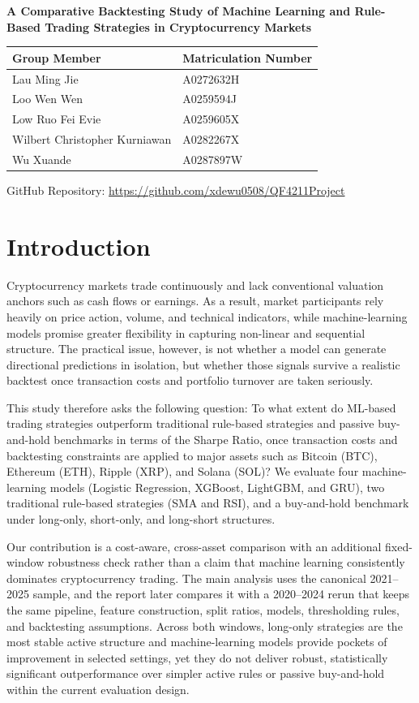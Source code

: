 \documentclass[12pt]{article}
\begin{document}
\begin{center}
{\large \textbf{A Comparative Backtesting Study of Machine Learning and Rule-Based Trading Strategies in Cryptocurrency Markets}}\\[1.5em]

\begingroup
\singlespacing
\begin{tabular}{ll}
\textbf{Group Member} & \textbf{Matriculation Number} \\
\midrule
Lau Ming Jie & A0272632H \\
Loo Wen Wen & A0259594J \\
Low Ruo Fei Evie & A0259605X \\
Wilbert Christopher Kurniawan & A0282267X \\
Wu Xuande & A0287897W \\
\end{tabular}
\endgroup

\vspace{1em}
GitHub Repository: \url{https://github.com/xdewu0508/QF4211Project}
\end{center}

\section{Introduction}

Cryptocurrency markets trade continuously and lack conventional valuation anchors such as cash flows or earnings. As a result, market participants rely heavily on price action, volume, and technical indicators, while machine-learning models promise greater flexibility in capturing non-linear and sequential structure. The practical issue, however, is not whether a model can generate directional predictions in isolation, but whether those signals survive a realistic backtest once transaction costs and portfolio turnover are taken seriously.

This study therefore asks the following question: To what extent do ML-based trading strategies outperform traditional rule-based strategies and passive buy-and-hold benchmarks in terms of the Sharpe Ratio, once transaction costs and backtesting constraints are applied to major assets such as Bitcoin (BTC), Ethereum (ETH), Ripple (XRP), and Solana (SOL)? We evaluate four machine-learning models (Logistic Regression, XGBoost, LightGBM, and GRU), two traditional rule-based strategies (SMA and RSI), and a buy-and-hold benchmark under long-only, short-only, and long-short structures.

Our contribution is a cost-aware, cross-asset comparison with an additional fixed-window robustness check rather than a claim that machine learning consistently dominates cryptocurrency trading. The main analysis uses the canonical 2021--2025 sample, and the report later compares it with a 2020--2024 rerun that keeps the same pipeline, feature construction, split ratios, models, thresholding rules, and backtesting assumptions. Across both windows, long-only strategies are the most stable active structure and machine-learning models provide pockets of improvement in selected settings, yet they do not deliver robust, statistically significant outperformance over simpler active rules or passive buy-and-hold within the current evaluation design.
\end{document}
